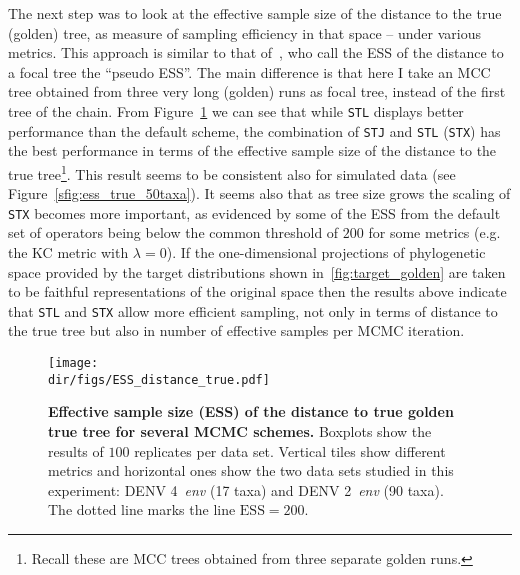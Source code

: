The next step was to look at the effective sample size of the distance to the true (golden) tree, as measure of sampling efficiency in that space -- under various metrics.
This approach is similar to that of~\cite{Lanfear2016}, who call the ESS of the distance to a focal tree the ``pseudo ESS''.
The main difference is that here I take an MCC tree obtained from three very long (golden) runs as focal tree, instead of the first tree of the chain.
From Figure~\ref{fig:ESS_distance_true} we can see that while \verb|STL| displays better performance than the default scheme, the combination of \verb|STJ| and \verb|STL| (\verb|STX|) has the best performance in terms of the effective sample size of the distance to the true tree\footnote{Recall these are  MCC trees obtained from three separate golden runs.}.
This result seems to be consistent also for simulated data (see Figure~\ref{sfig:ess_true_50taxa}).
It seems also that as tree size grows the scaling of \verb|STX| becomes more important, as evidenced by some of the ESS from the default set of operators being below the common threshold of $200$ for some metrics (e.g. the KC metric with $\lambda = 0$).
If the one-dimensional projections of phylogenetic space provided by the target distributions shown in~\ref{fig:target_golden} are taken to be faithful representations of the original space then the results above indicate that \verb|STL| and \verb|STX|  allow more efficient sampling, not only in terms of distance to the true tree but also in number of effective samples per MCMC iteration.
\begin{figure}[!ht]
\begin{center}
\texttt{[image: \\dir/figs/ESS\_distance\_true.pdf]} 
\end{center}
 \caption[Effective sample size (ESS) of the distance to true golden true tree for several MCMC schemes.]{\textbf{Effective sample size (ESS) of the distance to true golden true tree for several MCMC schemes.}
   Boxplots show the results of $100$ replicates per data set.
  Vertical tiles show different metrics and horizontal ones show the two data sets studied in this experiment: DENV 4~\textit{env} (17 taxa) and DENV 2~\textit{env} (90 taxa).
  The dotted line marks the line $\text{ESS} = 200$.
  }
 \label{fig:ESS_distance_true}
\end{figure}


